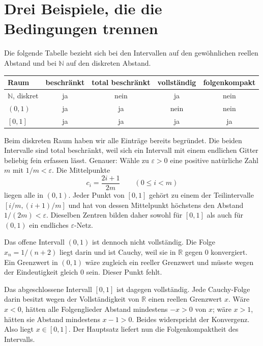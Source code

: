 \section*{Drei Beispiele, die die Bedingungen trennen}

Die folgende Tabelle bezieht sich bei den Intervallen auf den
gewöhnlichen reellen Abstand und bei \(\mathbb N\) auf den
diskreten Abstand.

\begin{center}
\small
\begin{tabular}{@{}lcccc@{}}
\toprule
Raum & beschränkt & total beschränkt & vollständig & folgenkompakt\\
\midrule
\(\mathbb N\), diskret & ja & nein & ja & nein\\
\((0,1)\)             & ja & ja   & nein & nein\\
\([0,1]\)            & ja & ja   & ja & ja\\
\bottomrule
\end{tabular}
\end{center}

Beim diskreten Raum haben wir alle Einträge bereits begründet.
Die beiden Intervalle sind total beschränkt, weil sich ein
Intervall mit einem endlichen Gitter beliebig fein erfassen lässt.
Genauer: Wähle zu \(\varepsilon>0\) eine positive natürliche
Zahl \(m\) mit \(1/m<\varepsilon\). Die Mittelpunkte
\[
 c_i=\frac{2i+1}{2m}\qquad(0\leq i<m)
\]
liegen alle in \((0,1)\). Jeder Punkt von \([0,1]\) gehört zu
einem der Teilintervalle \([i/m,(i+1)/m]\) und hat von dessen
Mittelpunkt höchstens den Abstand \(1/(2m)<\varepsilon\).
Dieselben Zentren bilden daher sowohl für \([0,1]\) als auch
für \((0,1)\) ein endliches \(\varepsilon\)-Netz.

Das offene Intervall \((0,1)\) ist dennoch nicht vollständig.
Die Folge \(x_n=1/(n+2)\) liegt darin und ist Cauchy, weil sie
in \(\mathbb R\) gegen \(0\) konvergiert. Ein Grenzwert in
\((0,1)\) wäre zugleich ein reeller Grenzwert und müsste wegen
der Eindeutigkeit gleich \(0\) sein. Dieser Punkt fehlt.

Das abgeschlossene Intervall \([0,1]\) ist dagegen vollständig.
Jede Cauchy-Folge darin besitzt wegen der Vollständigkeit von
\(\mathbb R\) einen reellen Grenzwert \(x\). Wäre \(x<0\),
hätten alle Folgenglieder Abstand mindestens \(-x>0\) von \(x\);
wäre \(x>1\), hätten sie Abstand mindestens \(x-1>0\).
Beides widerspricht der Konvergenz. Also liegt \(x\in[0,1]\).
Der Hauptsatz liefert nun die Folgenkompaktheit des Intervalls.

